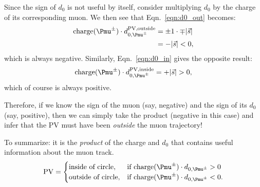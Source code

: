 Since the sign of $d_0$ is not useful by itself, consider multiplying $d_0$ by the charge of its corresponding muon. 
We then see that Eqn.~\ref{eqn:d0_out} becomes:
\begin{align*}
    {\rm charge}(\Pmu^{\pm}) \cdot d_{0,\Pmu^{\pm}}^{\text{PV,outside}} &= \pm1 \cdot \mp \lvert \vec{s} \rvert \\
    &= - \lvert \vec{s} \rvert < 0,
\end{align*}
which is always negative. Similarly, Eqn.~\ref{eqn:d0_in} gives the opposite result:
\begin{equation*}
    {\rm charge}(\Pmu^{\pm}) \cdot d_{0,\Pmu^{\pm}}^{\text{PV,inside}} = + \lvert \vec{s} \rvert > 0,
\end{equation*}
which of course is always positive. 

Therefore, if we know the sign of the muon (say, negative) 
and the sign of its $d_0$ (say, positive), 
then we can simply take the product (negative in this case) 
and infer that the PV must have been \emph{outside} the muon trajectory!

To summarize: it is the \emph{product} of the charge and $d_0$ that contains useful information about the muon track. 
\[
    {\rm PV} = 
\begin{cases}
    \text{inside of circle},& \text{if charge}(\Pmu^{\pm}) \cdot d_{0,\Pmu^{\pm}} > 0 \\
    \text{outside of circle},& \text{if charge}(\Pmu^{\pm}) \cdot d_{0,\Pmu^{\pm}} < 0.
\end{cases}
\]


